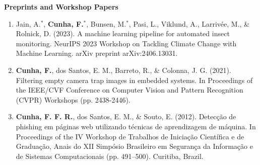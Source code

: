 \documentclass[10pt]{developercv} %
\begin{document}
\textbf{Preprints and Workshop Papers}

\begin{enumerate}
 \item Jain, A.$^\ast$, \textbf{Cunha, F.$^\ast$}, Bunsen, M.$^\ast$, Pasi, L.,
Viklund, A., Larrivée, M., \& Rolnick, D. (2023). A machine learning pipeline
for automated insect monitoring. NeurIPS 2023 Workshop on Tackling Climate
Change with Machine Learning. arXiv preprint arXiv:2406.13031.

 \item \textbf{Cunha, F.}, dos Santos, E. M., Barreto, R., \& Colonna, J. G.
(2021). Filtering empty camera trap images in embedded systems. In Proceedings
of the IEEE/CVF Conference on Computer Vision and Pattern Recognition (CVPR)
Workshops (pp. 2438-2446).

 \item \textbf{Cunha, F. F. R.}, dos Santos, E. M., \& Souto, E. (2012).
Detecção de phishing em páginas web utilizando técnicas de aprendizagem de
máquina. In Proceedings of the IV Workshop de Trabalhos de Iniciação Científica
e de Graduação, Anais do XII Simpósio Brasileiro em Segurança da Informação e
de Sistemas Computacionais (pp. 491–500). Curitiba, Brazil. \\
\end{enumerate}



\begin{minipage}[t]{0.3\textwidth}
  \vspace{-\baselineskip} %


  \begin{skills}
  \end{skills}
\end{minipage}
\end{document}
